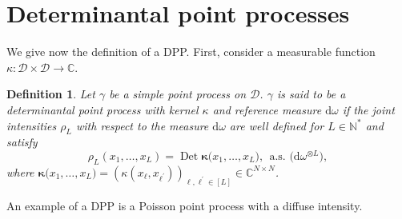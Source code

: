\documentclass[twoside,11pt]{book}
\newtheorem{definition}{Definition}
\numberwithin{theorem}{chapter}
\numberwithin{definition}{chapter}
\numberwithin{proposition}{chapter}
\numberwithin{corollary}{chapter}
\numberwithin{example}{chapter}
\numberwithin{lemma}{chapter}
\numberwithin{assumption}{chapter}
\numberwithin{equation}{chapter}
\numberwithin{figure}{chapter}
\DeclareMathOperator{\Det}{Det}
\begin{document}








\section{Determinantal point processes}\label{sec:dpp_defs}

We give now the definition of a DPP. First, consider a measurable function $\kappa: \mathcal{D} \times \mathcal{D} \rightarrow \mathbb{C}$.
\begin{definition}\label{def:def_dpp_chapter_2}
Let $\gamma$ be a simple point process on $\mathcal{D}$. $\gamma$ is said to be a determinantal point process with kernel $\kappa$ and reference measure $\mathrm{d}\omega$ if the joint intensities $\rho_L$ with respect to the measure $\mathrm{d}\omega$ are well defined for $L \in \mathbb{N}^{*}$ and satisfy
\begin{equation}\label{eq:correlation_functions_dpp_def}
 \rho_{L}(x_{1}, \dots, x_{L}) = \Det \bm{\kappa}\big( x_{1}, \dots, x_{L} \big), \:\: \text{a.s. (} \mathrm{d}\omega^{\otimes L} \text{)},
\end{equation}
where $\bm{\kappa}\big( x_{1}, \dots, x_{L} \big) = (\kappa(x_{\ell},x_{\ell^{'}}))_{\ell,\ell^{'} \in [L]} \in \mathbb{C}^{N \times N}$.

\end{definition}
An example of a DPP is a Poisson point process with a diffuse intensity.
\end{document}
